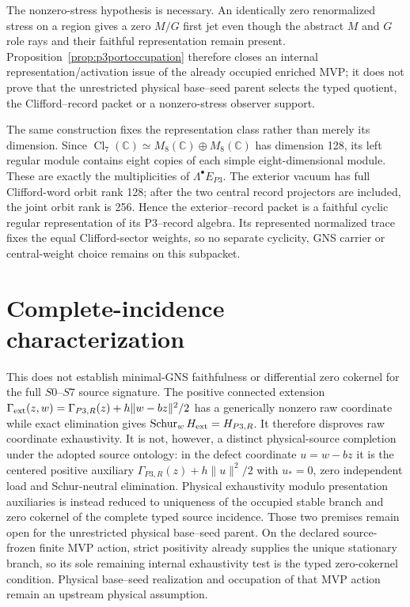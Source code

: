 The nonzero-stress hypothesis is necessary.  An identically zero
renormalized stress on a region gives a zero $M/G$ first jet even though the
abstract $M$ and $G$ role rays and their faithful representation remain
present.  Proposition~\ref{prop:p3portoccupation} therefore closes an
internal representation/activation issue of the already occupied enriched
MVP; it does not prove that the unrestricted physical base--seed parent
selects the typed quotient, the Clifford--record packet or a nonzero-stress
observer support.

The same construction fixes the representation class rather than merely its
dimension.  Since
$\operatorname{Cl}_7(\mathbb C)\simeq M_8(\mathbb C)\oplus M_8(\mathbb C)$
has dimension 128, its left regular module contains eight copies of each
simple eight-dimensional module.  These are exactly the multiplicities of
$\Lambda^\bullet E_{P3}$.  The exterior vacuum has full Clifford-word orbit
rank 128; after the two central record projectors are included, the joint
orbit rank is 256.  Hence the exterior--record packet is a faithful cyclic
regular representation of its P3--record algebra.  Its represented normalized
trace fixes the equal Clifford-sector weights, so no separate cyclicity, GNS
carrier or central-weight choice remains on this subpacket.

\section{Complete-incidence characterization}
\label{app:p3certificate}

This does not
establish minimal-GNS faithfulness or differential zero cokernel for the full
$S0$--$S7$ source signature.  The positive connected extension
$\Gamma_{\rm ext}(z,w)=\Gamma_{P3,R}(z)+h\lVert w-bz\rVert^2/2$ has a
generically nonzero raw coordinate while exact elimination gives
$\operatorname{Schur}_wH_{\rm ext}=H_{P3,R}$.  It therefore disproves raw
coordinate exhaustivity.  It is not, however, a distinct physical-source
completion under the adopted source ontology: in the defect coordinate
$u=w-bz$ it is the centered positive auxiliary
$\Gamma_{P3,R}(z)+h\lVert u\rVert^2/2$ with $u_*=0$, zero independent load and
Schur-neutral elimination.  Physical exhaustivity modulo presentation
auxiliaries is instead reduced to uniqueness of the occupied stable branch
and zero cokernel of the complete typed source incidence.  Those two premises
remain open for the unrestricted physical base--seed parent.  On the declared
source-frozen finite MVP action, strict positivity already supplies the unique
stationary branch, so its sole remaining internal exhaustivity test is the
typed zero-cokernel condition.  Physical base--seed realization and occupation
of that MVP action remain
an upstream physical assumption.

